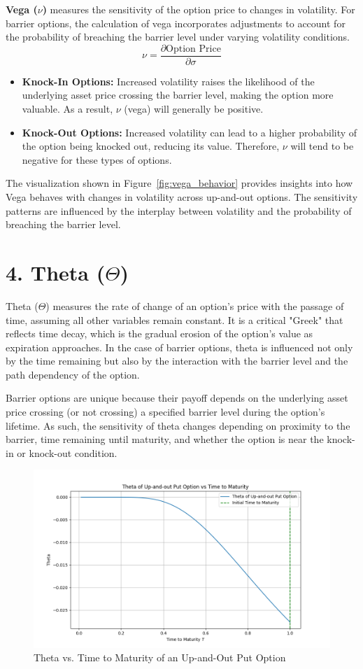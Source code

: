 \textbf{Vega (\(\nu\))} measures the sensitivity of the option price to changes in volatility. For barrier options, the calculation of vega incorporates adjustments to account for the probability of breaching the barrier level under varying volatility conditions.
\[
\nu = \frac{\partial \text{Option Price}}{\partial \sigma}
\]

\begin{itemize}
    \item \textbf{Knock-In Options:} Increased volatility raises the likelihood of the underlying asset price crossing the barrier level, making the option more valuable. As a result, \(\nu\) (vega) will generally be positive.
    \item \textbf{Knock-Out Options:} Increased volatility can lead to a higher probability of the option being knocked out, reducing its value. Therefore, \(\nu\) will tend to be negative for these types of options.
\end{itemize}

The visualization shown in Figure~\ref{fig:vega_behavior} provides insights into how Vega behaves with changes in volatility across up-and-out options. The sensitivity patterns are influenced by the interplay between volatility and the probability of breaching the barrier level.


\section{4. Theta (\(\Theta\))}

Theta (\(\Theta\)) measures the rate of change of an option's price with the passage of time, assuming all other variables remain constant. It is a critical "Greek" that reflects time decay, which is the gradual erosion of the option's value as expiration approaches. In the case of barrier options, theta is influenced not only by the time remaining but also by the interaction with the barrier level and the path dependency of the option.

Barrier options are unique because their payoff depends on the underlying asset price crossing (or not crossing) a specified barrier level during the option's lifetime. As such, the sensitivity of theta changes depending on proximity to the barrier, time remaining until maturity, and whether the option is near the knock-in or knock-out condition.

\begin{figure}[h]
    \centering
    \includegraphics[width=.65\linewidth]{content/images/theta_upout.png}
    \caption{Theta vs. Time to Maturity of an Up-and-Out Put Option}
    \label{fig:theta_behavior}
\end{figure}

